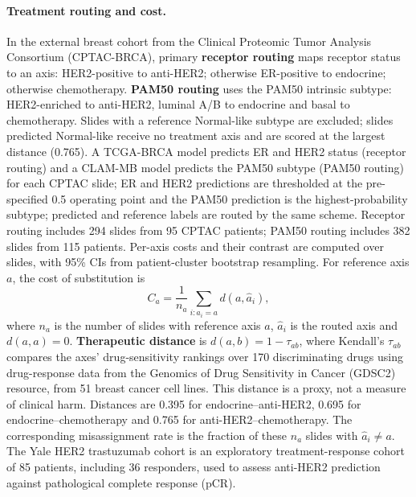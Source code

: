 \documentclass[a4paper,10pt,twocolumn]{extarticle}
\begin{document}
\paragraph{Treatment routing and cost.} In the external breast cohort from the Clinical Proteomic Tumor Analysis Consortium (CPTAC-BRCA), primary \textbf{receptor routing} maps receptor status to an axis: HER2-positive to anti-HER2; otherwise ER-positive to endocrine; otherwise chemotherapy. \textbf{PAM50 routing} uses the PAM50 intrinsic subtype: HER2-enriched to anti-HER2, luminal A/B to endocrine and basal to chemotherapy. Slides with a reference Normal-like subtype are excluded; slides predicted Normal-like receive no treatment axis and are scored at the largest distance (0.765). A TCGA-BRCA model predicts ER and HER2 status (receptor routing) and a CLAM-MB model predicts the PAM50 subtype (PAM50 routing) for each CPTAC slide; ER and HER2 predictions are thresholded at the pre-specified 0.5 operating point and the PAM50 prediction is the highest-probability subtype; predicted and reference labels are routed by the same scheme. Receptor routing includes 294 slides from 95 CPTAC patients; PAM50 routing includes 382 slides from 115 patients. Per-axis costs and their contrast are computed over slides, with 95\% CIs from patient-cluster bootstrap resampling. For reference axis $a$, the cost of substitution is
\[
 C_a=\frac{1}{n_a}\sum_{i:a_i=a} d(a,\widehat a_i),
\]
where $n_a$ is the number of slides with reference axis $a$, $\widehat a_i$ is the routed axis and $d(a,a)=0$. \textbf{Therapeutic distance} is $d(a,b)=1-\tau_{ab}$, where Kendall's $\tau_{ab}$ compares the axes' drug-sensitivity rankings over 170 discriminating drugs using drug-response data from the Genomics of Drug Sensitivity in Cancer (GDSC2) resource, from 51 breast cancer cell lines. This distance is a proxy, not a measure of clinical harm. Distances are 0.395 for endocrine--anti-HER2, 0.695 for endocrine--chemotherapy and 0.765 for anti-HER2--chemotherapy. The corresponding misassignment rate is the fraction of these $n_a$ slides with $\widehat a_i\ne a$. The Yale HER2 trastuzumab cohort is an exploratory treatment-response cohort of 85 patients, including 36 responders, used to assess anti-HER2 prediction against pathological complete response (pCR).
\end{document}
